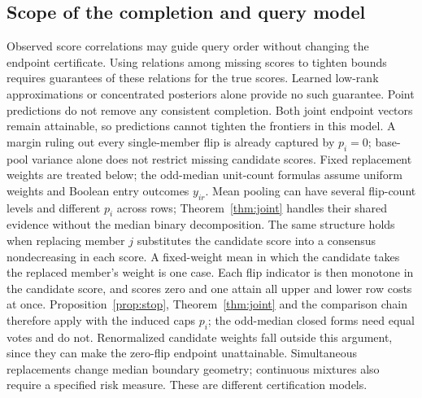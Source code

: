 \subsection{Scope of the completion and query model}
\label{app:model-scope}
Observed score correlations may guide query order without changing the endpoint certificate. Using relations among missing scores to tighten bounds requires guarantees of these relations for the true scores. Learned low-rank approximations or concentrated posteriors alone provide no such guarantee. Point predictions do not remove any consistent completion. Both joint endpoint vectors remain attainable, so predictions cannot tighten the frontiers in this model. A margin ruling out every single-member flip is already captured by $p_i=0$; base-pool variance alone does not restrict missing candidate scores. Fixed replacement weights are treated below; the odd-median unit-count formulas assume uniform weights and Boolean entry outcomes $y_{ir}$. Mean pooling can have several flip-count levels and different $p_i$ across rows; Theorem~\ref{thm:joint} handles their shared evidence without the median binary decomposition. The same structure holds when replacing member $j$ substitutes the candidate score into a consensus nondecreasing in each score. A fixed-weight mean in which the candidate takes the replaced member's weight is one case. Each flip indicator is then monotone in the candidate score, and scores zero and one attain all upper and lower row costs at once. Proposition~\ref{prop:stop}, Theorem~\ref{thm:joint} and the comparison chain therefore apply with the induced caps $p_i$; the odd-median closed forms need equal votes and do not. Renormalized candidate weights fall outside this argument, since they can make the zero-flip endpoint unattainable. Simultaneous replacements change median boundary geometry; continuous mixtures also require a specified risk measure. These are different certification models.

